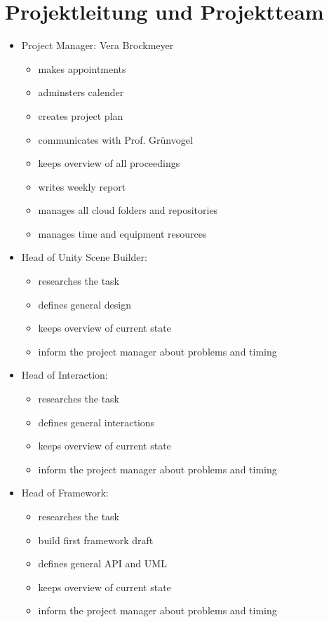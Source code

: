 \documentclass[a4paper, 12pt]{article}
\newcommand{\changefont}[3]{
\fontfamily{#1} \fontseries{#2} \fontshape{#3} \selectfont}
\begin{document}

%


\newpage



\section{Projektleitung und Projektteam}
\begin{itemize}
	\item Project Manager: Vera Brockmeyer
	\begin{itemize}
		\item makes appointments
		\item adminsters calender
		\item creates project plan
		\item communicates with Prof. Grünvogel
		\item keeps overview of all proceedings
		\item writes weekly report
		\item manages all cloud folders and repositories
		\item manages time and equipment resources 
		\end{itemize}
	\item Head of Unity Scene Builder:
		\begin{itemize}
		\item researches the task
		\item defines general design
		\item keeps overview of current state
		\item inform the project manager about problems and timing
	\end{itemize} 
	\item Head of Interaction:
		\begin{itemize}
		\item researches the task
		\item defines general interactions
		\item keeps overview of current state
		\item inform the project manager about problems and timing
	\end{itemize} 
	\item Head of Framework:
	\begin{itemize}
		\item researches the task
		\item build first framework draft
		\item defines general API and UML
		\item keeps overview of current state
		\item inform the project manager about problems and timing
	\end{itemize} 
\end{itemize}
\end{document}
